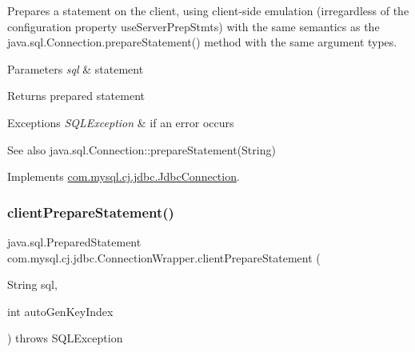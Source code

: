 Prepares a statement on the client, using client-\/side emulation (irregardless of the configuration property \textquotesingle{}use\+Server\+Prep\+Stmts\textquotesingle{}) with the same semantics as the java.\+sql.\+Connection.\+prepare\+Statement() method with the same argument types.


\begin{DoxyParams}{Parameters}
{\em sql} & statement \\
\hline
\end{DoxyParams}
\begin{DoxyReturn}{Returns}
prepared statement 
\end{DoxyReturn}

\begin{DoxyExceptions}{Exceptions}
{\em S\+Q\+L\+Exception} & if an error occurs \\
\hline
\end{DoxyExceptions}
\begin{DoxySeeAlso}{See also}
java.\+sql.\+Connection\+::prepare\+Statement(\+String) 
\end{DoxySeeAlso}


Implements \mbox{\hyperlink{interfacecom_1_1mysql_1_1cj_1_1jdbc_1_1_jdbc_connection_a62db1ccf7a070833775481acb5e9e359}{com.\+mysql.\+cj.\+jdbc.\+Jdbc\+Connection}}.

\mbox{\label{classcom_1_1mysql_1_1cj_1_1jdbc_1_1_connection_wrapper_a1dc0327172d67ed88fce75b54c5a87d8}} 
\subsubsection{\texorpdfstring{client\+Prepare\+Statement()}{clientPrepareStatement()}\hspace{0.1cm}{\footnotesize\ttfamily [2/6]}}
{\footnotesize\ttfamily java.\+sql.\+Prepared\+Statement com.\+mysql.\+cj.\+jdbc.\+Connection\+Wrapper.\+client\+Prepare\+Statement (\begin{DoxyParamCaption}\item[{String}]{sql,  }\item[{int}]{auto\+Gen\+Key\+Index }\end{DoxyParamCaption}) throws S\+Q\+L\+Exception}

